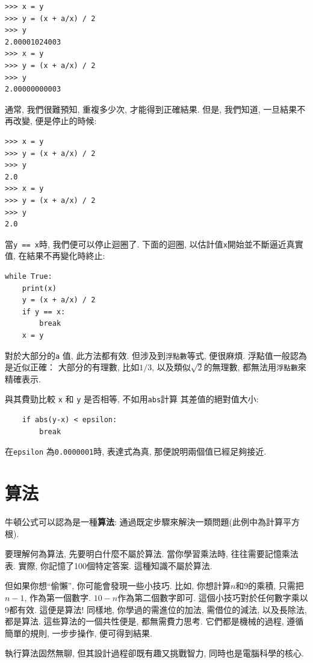 \documentclass[10pt]{book}
\begin{document}
\begin{verbatim}
>>> x = y
>>> y = (x + a/x) / 2
>>> y
2.00001024003
>>> x = y
>>> y = (x + a/x) / 2
>>> y
2.00000000003
\end{verbatim}
%
通常, 我們很難預知, 重複多少次, 才能得到正確結果. 
但是, 我們知道, 一旦結果不再改變, 便是停止的時候:

\begin{verbatim}
>>> x = y
>>> y = (x + a/x) / 2
>>> y
2.0
>>> x = y
>>> y = (x + a/x) / 2
>>> y
2.0
\end{verbatim}
%
當{\tt y == x}時, 我們便可以停止迴圈了. 
下面的迴圈, 以估計值{\tt x}開始並不斷逼近真實值, 在結果不再變化時終止:

\begin{verbatim}
while True:
    print(x)
    y = (x + a/x) / 2
    if y == x:
        break
    x = y
\end{verbatim}
%
對於大部分的{\tt a} 值, 此方法都有效. 
但涉及到{\tt 浮點數}等式, 便很麻煩. 
浮點值一般認為是近似正確：
大部分的有理數, 比如$1/3$, 
以及類似$\sqrt{2}$的無理數, 都無法用{\tt 浮點數}來精確表示. 

與其費勁比較 {\tt x} 和 {\tt y} 是否相等, 不如用{\tt abs}計算
其差值的絕對值大小:

\begin{verbatim}
    if abs(y-x) < epsilon:
        break
\end{verbatim}
%
在\verb"epsilon" 為{\tt 0.0000001}時, 表達式為真, 
那便說明兩個值已經足夠接近. 


\section{算法}
牛頓公式可以認為是一種{\bf 算法}:
通過既定步驟來解決一類問題(此例中為計算平方根). 

要理解何為算法, 先要明白什麼不屬於算法. 
當你學習乘法時, 往往需要記憶乘法表. 
實際, 你記憶了100個特定答案. 這種知識不屬於算法. 

但如果你想``偷懶'', 你可能會發現一些小技巧. 
比如, 你想計算$n$和9的乘積, 只需把$n-1$, 作為第一個數字. 
$10-n$作為第二個數字即可. 這個小技巧對於任何數字乘以9都有效. 
這便是算法!
同樣地, 你學過的需進位的加法, 需借位的減法, 以及長除法, 
都是算法. 這些算法的一個共性便是, 都無需費力思考. 
它們都是機械的過程, 
遵循簡單的規則, 一步步操作, 便可得到結果. 

執行算法固然無聊, 但其設計過程卻既有趣又挑戰智力, 
同時也是電腦科學的核心. 
\end{document}
